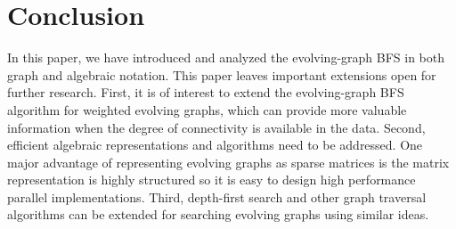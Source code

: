 \documentclass[11pt, conference, , compsocconf]{IEEEtran}
\theoremstyle{definition}
\begin{document}
\section{Conclusion}

In this paper, we have introduced and analyzed the evolving-graph BFS in both 
graph and algebraic notation. 
This paper leaves important extensions open for further research. First, it is 
of interest to extend the evolving-graph BFS algorithm for weighted evolving graphs, which can provide more valuable information when the degree of connectivity is available in the data. 
Second, efficient algebraic representations and algorithms need to be addressed. 
One major advantage of representing evolving graphs as sparse matrices
is the matrix representation is highly structured so it is easy to design
high performance parallel implementations. 
Third, depth-first search and other graph traversal algorithms can be 
extended for searching evolving graphs using similar ideas. 








%
%
%



 

\end{document}
